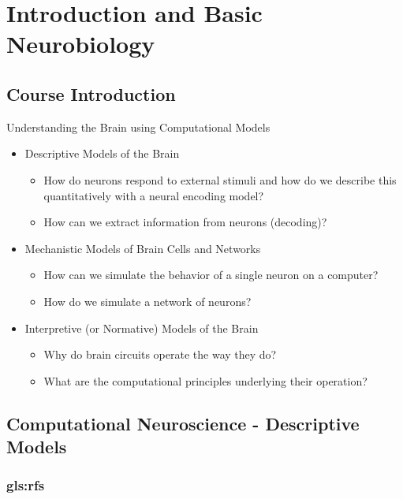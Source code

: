 \documentclass[]{article}
\begin{document}
\tableofcontents

\section{Introduction and Basic Neurobiology}\label{sec:week1}

\subsection{Course Introduction}

Understanding the Brain using Computational Models
\begin{itemize}
	\item Descriptive Models of the Brain
	\begin{itemize}
		\item How do neurons respond to external stimuli and how do we
		describe this quantitatively with a neural encoding model?
		\item How can we extract information from neurons (decoding)?
	\end{itemize}
    \item Mechanistic Models of Brain Cells and Networks
	\begin{itemize}
		\item     How can we simulate the behavior of a single neuron on a
	    computer?
	    \item How do we simulate a network of neurons?
	\end{itemize}
	\item  Interpretive (or Normative) Models of the Brain
	\begin{itemize}
		\item 	Why do brain circuits operate the way they do?
		\item What are the computational principles underlying their
		operation?
	\end{itemize}
\end{itemize}

\subsection{Computational Neuroscience - Descriptive Models}

\subsubsection{\Glspl{gls:rf}}
\end{document}

